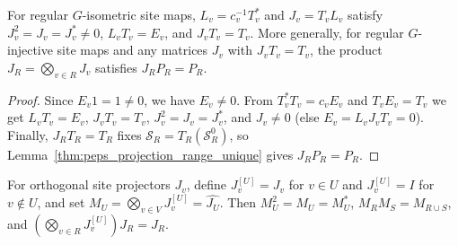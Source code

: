 \begin{lemma}%
    \label{thm:peps_nonzero_site_images}
    \leanok
    For regular $G$-isometric site maps, $L_v=c_v^{-1}T_v^*$ and $J_v=T_vL_v$
    satisfy $J_v^2=J_v=J_v^*\ne0$, $L_vT_v=E_v$, and $J_vT_v=T_v$.
    More generally, for regular $G$-injective site maps and any matrices $J_v$
    with $J_vT_v=T_v$, the product $J_R=\bigotimes_{v\in R}J_v$ satisfies
    $J_RP_R=P_R$.
\end{lemma}
\begin{proof}\leanok
    Since $E_v1=1\ne0$, we have $E_v\ne0$. From $T_v^*T_v=c_vE_v$ and
    $T_vE_v=T_v$ we get $L_vT_v=E_v$, $J_vT_v=T_v$, $J_v^2=J_v=J_v^*$, and
    $J_v\ne0$ (else $E_v=L_vJ_vT_v=0$). Finally, $J_RT_R=T_R$ fixes
    $\mathcal S_R=T_R(\mathcal S_R^0)$, so Lemma~\ref{thm:peps_projection_range_unique}
    gives $J_RP_R=P_R$.
\end{proof}

\begin{definition}%
    \label{def:peps_site_image_products}
    \leanok
    For orthogonal site projectors $J_v$, define $J_v^{[U]}=J_v$ for $v\in U$
    and $J_v^{[U]}=I$ for $v\notin U$, and set
    $M_U=\bigotimes_{v\in V}J_v^{[U]}=\widehat{J_U}$. Then $M_U^2=M_U=M_U^*$,
    $M_RM_S=M_{R\cup S}$, and $(\bigotimes_{v\in R}J_v^{[U]})J_R=J_R$.
\end{definition}

